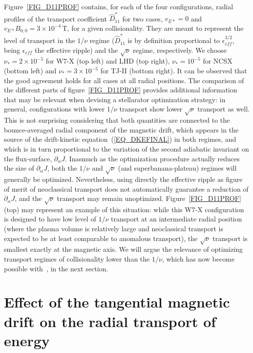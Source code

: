 Figure~\ref{FIG_D11PROF} contains, for each of the four configurations, radial profiles of the transport coefficient $\hat D^*_{11}$ for two cases, $v_{E*}=0$ and $v_{E*}B_{0,0}=3\times 10^{-4}\,$T, for a given collisionality.  They are meant to represent the level of transport in the $1/\nu$ regime ($\hat D^*_{11}$ is by definition proportional to $\epsilon_{eff}^{3/2}$, being $\epsilon_{eff}$ the effective ripple) and  the $\sqrt{\nu}$ regime, respectively. We choose $\nu_*=2\times 10^{-5}$  for W7-X (top left) and LHD (top right), $\nu_*=10^{-5}$ for NCSX (bottom left) and $\nu_*=3\times 10^{-5}$ for TJ-II (bottom right). It can be observed that the good agreement holds for all cases at all radial positions. The comparison of the different parts of figure~\ref{FIG_D11PROF} provides additional information that may be relevant when devising a stellarator optimization strategy: in general, configurations with lower $1/\nu$ transport show lower $\sqrt{\nu}$ transport as well. This is not surprising considering that both quantities are connected to the bounce-averaged radial component of the magnetic drift, which appears in the source of the drift-kinetic equation~(\ref{EQ_DKEFINAL}) in both regimes, and which is in turn proportional to the variation of the second adiabatic invariant on the flux-surface, $\partial_\alpha J$. Inasmuch as the optimization procedure actually reduces the size of $\partial_\alpha J$, both the $1/\nu$ and $\sqrt{\nu}$ (and superbanana-plateau) regimes will generally be optimized. Nevertheless, using directly the effective ripple as figure of merit of neoclassical transport does not automatically guarantee a reduction of $\partial_\alpha J$, and the $\sqrt{\nu}$ transport may remain unoptimized. Figure~\ref{FIG_D11PROF}  (top) may represent an example of this situation: while this W7-X configuration is designed to have low level of $1/\nu$ transport at an intermediate radial position (where the plasma volume is relatively large and neoclassical transport is expected to be at least comparable to anomalous transport), the $\sqrt{\nu}$ transport is smallest exactly at the magnetic axis. We will argue the relevance of optimizing transport regimes of collisionality lower than the $1/\nu$, which has now become possible with~\KNOSOS, in the next section.



\section{Effect of the tangential magnetic drift on the radial transport of energy}\label{SEC_TANGVM}

